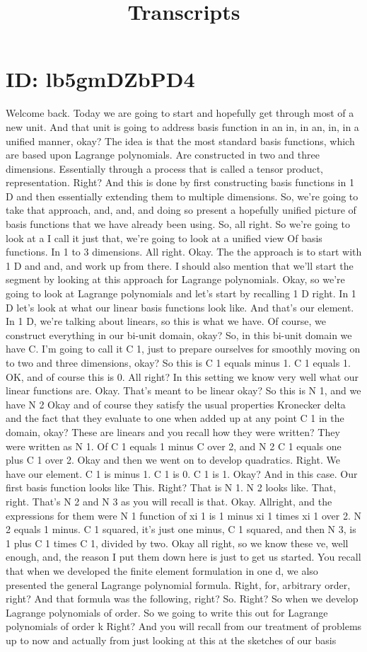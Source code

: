 \documentclass[10pt]{article}
\title{Transcripts}
\date{}
\begin{document}
\section*{ID: lb5gmDZbPD4}
Welcome back. Today we are going to start and hopefully get through most of a new unit. And that unit is going to address basis function in an in, in an, in, in a unified manner, okay? The idea is that the most standard basis functions, which are based upon Lagrange polynomials. Are constructed in two and three dimensions. Essentially through a process that is called a tensor product, representation. Right? And this is done by first constructing basis functions in 1 D and then essentially extending them to multiple dimensions. So, we're going to take that approach, and, and, and doing so present a hopefully unified picture of basis functions that we have already been using. So, all right. So we're going to look at a I call it just that, we're going to look at a unified view Of basis functions. In 1 to 3 dimensions. All right. Okay. The the approach is to start with 1 D and and, and work up from there. I should also mention that we'll start the segment by looking at this approach for Lagrange polynomials. Okay, so we're going to look at Lagrange polynomials and let's start by recalling 1 D right. In 1 D let's look at what our linear basis functions look like. And that's our element. In 1 D, we're talking about linears, so this is what we have. Of course, we construct everything in our bi-unit domain, okay? So, in this bi-unit domain we have C. I'm going to call it C 1, just to prepare ourselves for smoothly moving on to two and three dimensions, okay? So this is C 1 equals minus 1. C 1 equals 1. OK, and of course this is 0. All right? In this setting we know very well what our linear functions are. Okay. That's meant to be linear okay? So this is N 1, and we have N 2 Okay and of course they satisfy the usual properties Kronecker delta and the fact that they evaluate to one when added up at any point C 1 in the domain, okay? These are linears and you recall how they were written? They were written as N 1. Of C 1 equals 1 minus C over 2, and N 2 C 1 equals one plus C 1 over 2. Okay and then we went on to develop quadratics. Right. We have our element. C 1 is minus 1. C 1 is 0. C 1 is 1. Okay? And in this case. Our first basis function looks like This. Right? That is N 1. N 2 looks like. That, right. That's N 2 and N 3 as you will recall is that. Okay. Allright, and the expressions for them were N 1 function of xi 1 is 1 minus xi 1 times xi 1 over 2. N 2 equals 1 minus. C 1 squared, it's just one minus, C 1 squared, and then N 3, is 1 plus C 1 times C 1, divided by two. Okay all right, so we know these ve, well enough, and, the reason I put them down here is just to get us started. You recall that when we developed the finite element formulation in one d, we also presented the general Lagrange polynomial formula. Right, for, arbitrary order, right? And that formula was the following, right? So. Right? So when we develop Lagrange polynomials of order. So we going to write this out for Lagrange polynomials of order k Right? And you will recall from our treatment of problems up to now and actually from just looking at this at the sketches of our basis 
\end{document}
